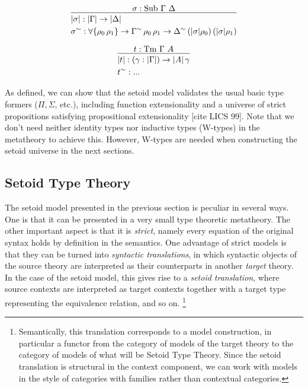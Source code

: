 \documentclass{easychair}
\newcommand{\GG}{\Gamma}
\newcommand{\GD}{\Delta}
\newcommand{\Tm}{\mathrm{Tm}}
\newcommand{\Sub}{\mathrm{Sub}}
\begin{document}
\[
\infer{
  \begin{aligned}
    & | \sigma | : | \GG | \to | \GD | \\
    & \sigma^\sim : \forall\{\rho_0\, \rho_1\} \to \GG^\sim\, \rho_0\, \rho_1 \to \GD^\sim\, (|\sigma|\rho_0)\, (|\sigma|\rho_1)
  \end{aligned}
}{
  \sigma : \Sub\ \GG\ \GD
}
\]

\[
\infer{
  \begin{aligned}
    & | t | : (\gamma : | \GG |) \to | A | \, \gamma \\
    & t^\sim : ...
  \end{aligned}
}{
  t : \Tm\ \GG\ A
}
\]

As defined, we can show that the setoid model validates the usual basic type
formers ($\Pi, \Sigma$, etc.), including function extensionality and a universe
of strict propositions satisfying propositional extensionality [cite LICS
  99]. Note that we don't need neither identity types nor inductive types
(W-types) in the metatheory to achieve this. However, W-types are needed when
constructing the setoid universe in the next sections.

\subsection{Setoid Type Theory}\label{sett}

The setoid model presented in the previous section is peculiar in several
ways. One is that it can be presented in a very small type theoretic
metatheory. The other important aspect is that it is \emph{strict}, namely every
equation of the original syntax holds by definition in the semantics. One
advantage of strict models is that they can be turned into \emph{syntactic
  translations}, in which syntactic objects of the source theory are interpreted
as their counterparts in another \emph{target} theory. In the case of the setoid
model, this gives rise to a \emph{setoid translation}, where source contexts are
interpreted as target contexts together with a target type representing the
equivalence relation, and so on.%
\footnote{%
Semantically, this translation corresponds to a model construction, in particular a functor from the category of models of the target theory to the category of models of what will be Setoid Type Theory.
Since the setoid translation is structural in the context component, we can work with models in the style of categories with families rather than contextual categories.
}
\end{document}
